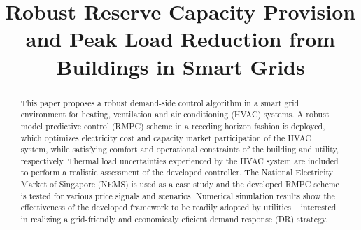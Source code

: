 \documentclass[conference,10pt]{IEEEtran}
\begin{document}
 
\title{Robust Reserve Capacity Provision and Peak Load Reduction from Buildings in Smart Grids}
\author{





}
\maketitle

\begin{abstract}
This paper proposes a robust demand-side control algorithm in a smart grid environment for heating, ventilation and air conditioning (HVAC) systems. A robust model predictive control (RMPC) scheme in a receding horizon fashion is deployed, which optimizes electricity cost and capacity market participation of the HVAC system, while satisfying comfort and operational constraints of the building and utility, respectively. Thermal load uncertainties experienced by the HVAC system are included to perform a realistic assessment of the developed controller. The National Electricity Market of Singapore (NEMS) is used as a case study and the developed RMPC scheme is tested for various price signals and scenarios. Numerical simulation results show the effectiveness of the developed framework to be readily adopted by utilities -- interested in realizing a grid-friendly and economicaly eficient demand response (DR) strategy.
\end{abstract}
\end{document}
